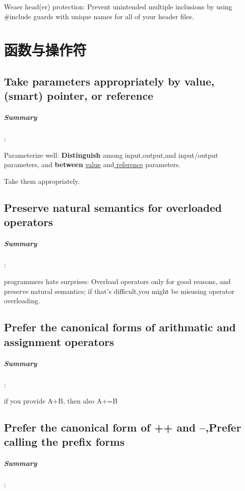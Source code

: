 \documentclass[UTF8,a4paper,12pt]{ctexbook}
\begin{document}
			Weaer head(er) protection: Prevent unintended multiple inclusions by using \#include guards with unique names for all of your header files.
			
\chapter{函数与操作符}
	\section{Take parameters appropriately by value, (smart) pointer, or reference}
		\paragraph{Summary}:
			
			Parameterize well: \textbf{Distinguish} among input,output,and input/output parameters, and \textbf{between} \underline{value} and\underline{ reference} parameters.
			
			Take them appropriately.
			
	\section{Preserve natural semantics for overloaded operators}
		\paragraph{Summary}:
		
			programmers hate surprises: Overload operators only for good reasons, and preserve natural semantics; if that's difficult,you might be misusing operator overloading.
	\section{Prefer the canonical forms of arithmatic and assignment operators}
		\paragraph{Summary}:
			
		if you provide A+B, then also A+=B	
	\section{Prefer the canonical form of ++ and --,Prefer calling the prefix forms}
		\paragraph{Summary}:
		
\end{document}

